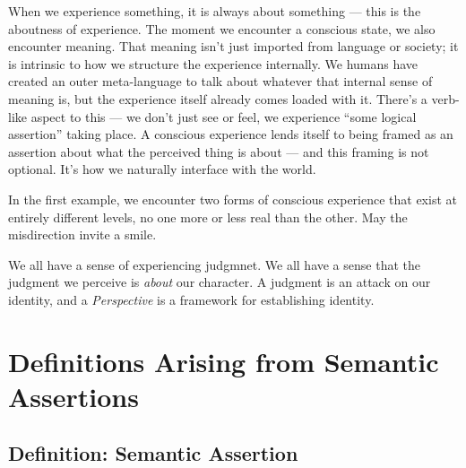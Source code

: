 \documentclass[runningheads]{llncs}
\begin{document}
When we experience something, it is always about something — this is the aboutness of experience. The moment we encounter a conscious state, we also encounter meaning. That meaning isn’t just imported from language or society; it is intrinsic to how we structure the experience internally. We humans have created an outer meta-language to talk about whatever that internal sense of meaning is, but the experience itself already comes loaded with it. There's a verb-like aspect to this — we don’t just see or feel, we experience “some logical assertion” taking place. A conscious experience lends itself to being framed as an assertion about what the perceived thing is about — and this framing is not optional. It’s how we naturally interface with the world.


In the first example, we encounter two forms of conscious experience that exist at entirely different levels, no one more or less real than the other. May the misdirection invite a smile. 

We all have a sense of experiencing judgmnet. We all have a sense that the judgment we perceive is \textit{about} our character. A judgment is an attack on our identity, and a \textit{Perspective} is a framework for establishing identity. 


\section{Definitions Arising from Semantic Assertions}


\subsection{Definition: Semantic Assertion}
\end{document}
